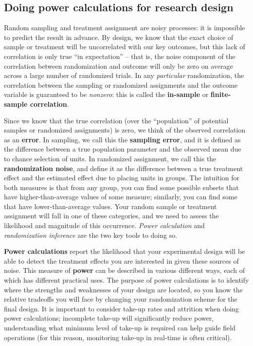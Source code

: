 
\subsection{Doing power calculations for research design}

Random sampling and treatment assignment are noisy processes:
it is impossible to predict the result in advance.
By design, we know that the exact choice of sample or treatment
will be uncorrelated with our key outcomes,
but this lack of correlation is only true ``in expectation'' --
that is, the noise component of the correlation between randomization and outcome 
will only be zero on average across a large number of randomized trials.
In any \textit{particular} randomization,
the correlation between the sampling or randomized assignments and the outcome variable
is guaranteed to be \textit{nonzero}:
this is called the \textbf{in-sample} or \textbf{finite-sample correlation}.

Since we know that the true correlation
(over the ``population'' of potential samples or randomized assignments)
is zero, we think of the observed correlation as an \textbf{error}.
In sampling, we call this the \textbf{sampling error},
and it is defined as the difference between a true population parameter
and the observed mean due to chance selection of units.
In randomized assignment, we call this the \textbf{randomization noise},
and define it as the difference between a true treatment effect
and the estimated effect due to placing units in groups.
The intuition for both measures is that from any group,
you can find some possible subsets that have higher-than-average values of some measure;
similarly, you can find some that have lower-than-average values.
Your random sample or treatment assignment will fall in one of these categories,
and we need to assess the likelihood and magnitude of this occurrence.
\textit{Power calculation} and \textit{randomization inference} are the two key tools to doing so.

\textbf{Power calculations} report the likelihood that your experimental design
will be able to detect the treatment effects you are interested in
given these sources of noise.
This measure of \textbf{power} can be described in various different ways,
each of which has different practical uses.
The purpose of power calculations is to identify where the strengths and weaknesses
of your design are located, so you know the relative tradeoffs you will face
by changing your randomization scheme for the final design.
It is important to consider take-up rates and attrition when doing power calculations;
incomplete take-up will significantly reduce power, 
understanding what minimum level of take-up is required can help guide field operations
(for this reason, monitoring take-up in real-time is often critical).

